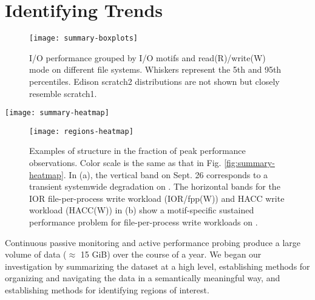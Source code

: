 \section{Identifying Trends}  \label{sec:features}

\begin{figure}
    \centering
    \texttt{[image: summary-boxplots]}
    \vspace{-.15in}
    \caption{I/O performance grouped by I/O motifs and read(R)/write(W) mode on different file systems.  Whiskers represent the 5th and 95th percentiles.  Edison scratch2 distributions are not shown but closely resemble scratch1.}
    \label{fig:summary-boxplots}
	\vspace{-.15in}
\end{figure}

\begin{figure*}
    \centering
    \texttt{[image: summary-heatmap]}
    \vspace{-.2in}
    \caption{Performance of daily probes normalized to the peak observed performance for each probe type (I/O motif and read/write mode combination) on the specified system.  The y-axis labels show combinations of system, I/O motif, and mode (Read/Write).  Grey represents days on which no observations were made.  The two regions highlighted in green boxes are expanded upon in Figure \ref{fig:regions-heatmap}.}
    \label{fig:summary-heatmap}
\end{figure*}

\begin{figure}
    \centering
    \texttt{[image: regions-heatmap]}
    \vspace{-.2in}
    \caption{Examples of structure in the fraction of peak performance observations.  Color scale is the same as that in Fig. \ref{fig:summary-heatmap}.  In (a), the vertical band on Sept. 26 corresponds to a transient systemwide degradation on \mira.  The horizontal bands for the IOR file-per-process write workload (IOR/fpp(W)) and HACC write workload (HACC(W)) in (b) show a motif-specific sustained performance problem for file-per-process write workloads on \cori.}
    \label{fig:regions-heatmap}
\end{figure}

Continuous passive monitoring and active performance probing produce
a large volume of data ($\approx$ 15 GiB) over the course of a year.  We began our
investigation by summarizing the dataset at a high level, establishing
methods for organizing and navigating the data in a semantically
meaningful way, and establishing methods for identifying regions of
interest.

